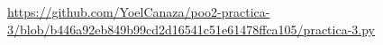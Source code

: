 \documentclass[11pt,a4paper]{article}
\begin{document}
\begin{sloppypar}
\url{https://github.com/YoelCanaza/poo2-practica-3/blob/b446a92eb849b99cd2d16541c51e61478ffca105/practica-3.py}
\end{sloppypar}


\end{document}
